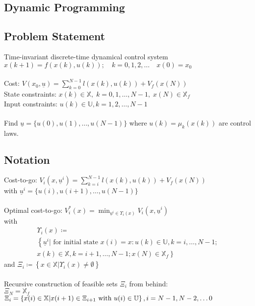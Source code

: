 \documentclass[english]{latex4ei/latex4ei_sheet}
\begin{document}
\begin{sectionbox}
\section{Dynamic Programming}

\subsection{Problem Statement}
Time-invariant discrete-time dynamical control system\\
$x(k+1)=f(x(k), u(k)) ; \quad k=0,1,2, \ldots \quad x(0)=x_{0}$ \\ \\
Cost: $V\left(x_{0}, \underline{u}\right)=\sum\limits_{k=0}^{N-1} l(x(k), u(k))+V_{f}(x(N))$ \\
State constraints: $x(k) \in \mathbb{X},\; k=0,1, \ldots, N-1,\; x(N) \in \mathbb{X}_{f}$\\
Input constraints: $u(k) \in \mathbb{U}, k=1,2, \ldots, N-1$ \\ \\
Find $\underline{u}=\{u(0), u(1), \ldots, u(N-1)\}$ where $u(k)=\mu_{k}(x(k))$ are control laws.\\

\subsection{Notation}
Cost-to-go: $V_{i}\left(x, \underline{u}^{i}\right)=\sum\limits_{k=i}^{N-1} l(x(k), u(k))+V_{f}(x(N))$ \\
with $\underline{u}^{i}=\{u(i), u(i+1), \ldots, u(N-1)\}$ \\ \\
Optimal cost-to-go: $V_{i}^{*}(x)=\min _{\underline{u}^{i} \in \Upsilon_{i}(x)} V_{i}\left(x, \underline{u}^{i}\right)$ \\
with
\begin{multline*} \Upsilon_{i}(x)\coloneqq\\\left\{\underline{u}^{i} | \text { for initial state } x(i)=x: u(k) \in \mathbb{U}, k=i, \ldots, N-1;\right.\\\left.x(k) \in \mathbb{X}, k=i+1, \ldots, N-1 ; x(N) \in \mathbb{X}_{f}\right\} 
\end{multline*}
and $\Xi_{i}\coloneqq\left\{x \in \mathbb{X} | \Upsilon_{i}(x) \neq \emptyset\right\}$ \\
\\
Recursive construction of feasible sets $\Xi_{i}$ from behind:\\ 
$\Xi_{N}=\mathbb{X}_{f}$ \\ 
$\Xi_{i}=\left\{x(i) \in \mathbb{X} | x(i+1) \in \Xi_{i+1} \text { with } u(i) \in \mathbb{U}\right\},\\
i=N-1, N-2, \ldots 0$\\

\end{sectionbox}
\end{document}
